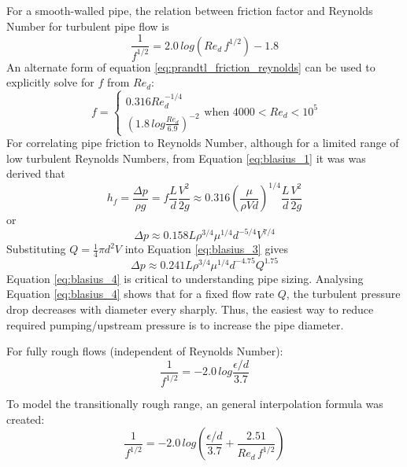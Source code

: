\documentclass[9pt]{article} %
\numberwithin{equation}{section} %
\begin{document}
For a smooth-walled pipe, the relation between friction factor and Reynolds Number for turbulent pipe flow is
\begin{equation} \label{eq:prandtl_friction_reynolds}
\frac{1}{f^{1/2}} = 2.0\, log({Re_{d}\, f^{1/2}}) - 1.8
\end{equation}
An alternate form of equation \ref{eq:prandtl_friction_reynolds} can be used to explicitly solve for $f$ from $Re_{d}$:
\begin{equation} \label{eq:blasius_1}
f = 
\begin{cases}
0.316 Re_{d}^{-1/4}\\%
\left( 1.8\, log \frac{Re_{d}}{6.9} \right)^{-2}%
\end{cases}
\text{when } 4000 < Re_{d} < 10^{5}
\end{equation}
For correlating pipe friction to Reynolds Number, although for a limited range of low turbulent Reynolds Numbers, from Equation \ref{eq:blasius_1} it was was derived that
\begin{equation} \label{eq:blasius_2}
h_{f} = \frac{\Delta p}{\rho g} = f \frac{L}{d} \frac{V^{2}}{2g} \approx 0.316 \left( \frac{\mu}{\rho V d} \right)^{1/4} \frac{L}{d} \frac{V^{2}}{2g}
\end{equation}
or
\begin{equation} \label{eq:blasius_3}
\Delta p \approx 0.158 L \rho^{3/4} \mu^{1/4} d^{-5/4} V^{7/4}
\end{equation}
Substituting $Q = \frac{1}{4} \pi d^{2} V$ into Equation \ref{eq:blasius_3} gives
\begin{equation} \label{eq:blasius_4}
\Delta p \approx 0.241 L \rho^{3/4} \mu^{1/4} d^{-4.75} Q^{1.75}
\end{equation}
Equation \ref{eq:blasius_4} is critical to understanding pipe sizing. Analysing Equation \ref{eq:blasius_4} shows that for a fixed flow rate $Q$, the turbulent pressure drop decreases with diameter every sharply. Thus, the easiest way to reduce required pumping/upstream pressure is to increase the pipe diameter.

For fully rough flows (independent of Reynolds Number):
\begin{equation} \label{eq:rough_friction}
\frac{1}{f^{1/2}} = -2.0\, log \frac{\epsilon/d}{3.7}
\end{equation}

To model the transitionally rough range, an general interpolation formula was created:
\begin{equation} \label{eq:moody}
\frac{1}{f^{1/2}} = -2.0\, log \left( \frac{\epsilon/d}{3.7} + \frac{2.51}{Re_{d}\, f^{1/2}} \right)
\end{equation}
\end{document}
